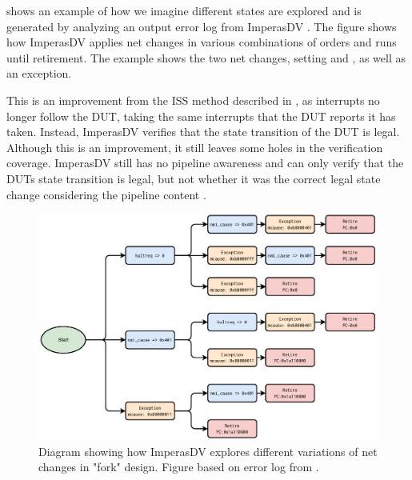  shows an example of how we imagine different states are explored and is generated by analyzing an output error log from ImperasDV \cite{ISSMismatchPending2023}. The figure shows how ImperasDV applies net changes in various combinations of orders and runs until retirement. The example shows the two net changes, setting  and , as well as an exception. 

This is an improvement from the ISS method described in , as interrupts no longer follow the DUT, taking the same interrupts that the DUT reports it has taken. Instead, ImperasDV verifies that the state transition of the DUT is legal. Although this is an improvement, it still leaves some holes in the verification coverage.
ImperasDV still has no pipeline awareness and can only verify that the DUTs state transition is legal, but not whether it was the correct legal state change considering the pipeline content \cite{taylorAdvancedRISCVVerification2023}.

\begin{figure}
    \centering
    \includegraphics[width=1.0\linewidth]{figures/ImperasExecution.pdf}
    \caption{Diagram showing how ImperasDV explores different variations of net changes in "fork" design. Figure based on error log from \cite{ISSMismatchPending2023}. }
    \label{fig:imperasFork}
\end{figure}

%
%
%
%
%




